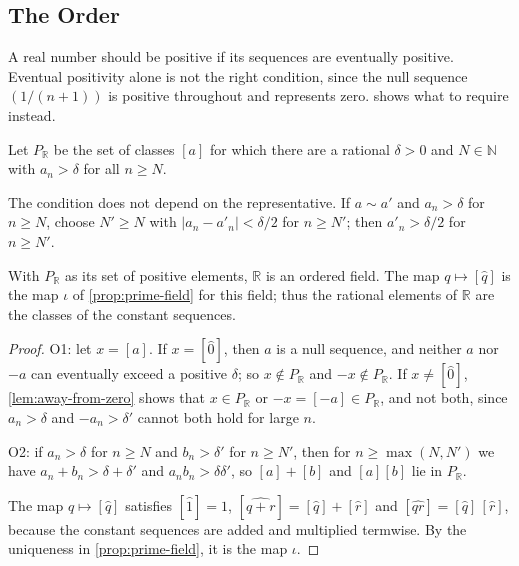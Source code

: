\subsection{The Order}

A real number should be positive if its sequences are eventually positive. Eventual positivity alone is not the right condition, since the null sequence $(1/(n+1))$ is positive throughout and represents zero.  shows what to require instead.

\begin{definition}
\label{def:real-positive}
Let $P_{\mathbb R}$ be the set of classes $[a]$ for which there are a rational $\delta>0$ and $N\in\mathbb N$ with $a_n>\delta$ for all $n\ge N$.
\end{definition}

The condition does not depend on the representative. If $a\sim a'$ and $a_n>\delta$ for $n\ge N$, choose $N'\ge N$ with $|a_n-a'_n|<\delta/2$ for $n\ge N'$; then $a'_n>\delta/2$ for $n\ge N'$.

\begin{theorem}
\label{thm:r-ordered}
With $P_{\mathbb R}$ as its set of positive elements, $\mathbb R$ is an ordered field. The map $q\mapsto[\hat q]$ is the map $\iota$ of \cref{prop:prime-field} for this field; thus the rational elements of $\mathbb R$ are the classes of the constant sequences.
\end{theorem}

\begin{proof}
O1: let $x=[a]$. If $x=[\hat0]$, then $a$ is a null sequence, and neither $a$ nor $-a$ can eventually exceed a positive $\delta$; so $x\notin P_{\mathbb R}$ and $-x\notin P_{\mathbb R}$. If $x\ne[\hat0]$, \cref{lem:away-from-zero} shows that $x\in P_{\mathbb R}$ or $-x=[-a]\in P_{\mathbb R}$, and not both, since $a_n>\delta$ and $-a_n>\delta'$ cannot both hold for large $n$.

O2: if $a_n>\delta$ for $n\ge N$ and $b_n>\delta'$ for $n\ge N'$, then for $n\ge\max(N,N')$ we have $a_n+b_n>\delta+\delta'$ and $a_nb_n>\delta\delta'$, so $[a]+[b]$ and $[a][b]$ lie in $P_{\mathbb R}$.

The map $q\mapsto[\hat q]$ satisfies $[\hat1]=1$, $[\widehat{q+r}]=[\hat q]+[\hat r]$ and $[\widehat{qr}]=[\hat q]\,[\hat r]$, because the constant sequences are added and multiplied termwise. By the uniqueness in \cref{prop:prime-field}, it is the map $\iota$.
\end{proof}

